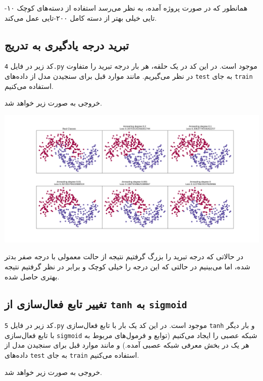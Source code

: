 \documentclass[a4paper, 12pt]{article}
\theoremstyle{definition}
\begin{document}
همانطور که در صورت پروژه آمده، به نظر می‌رسد استفاده از دسته‌های کوچک ۱۰-تایی خیلی بهتر از دسته کامل ۲۰۰-تایی عمل می‌کند.

\subsection{تبرید درجه یادگیری به تدریج}
کد زیر در فایل
\texttt{4.py}
موجود است. در این کد در یک حلقه، هر بار درجه تبرید را متفاوت در نظر می‌گیریم. مانند موارد قبل برای سنجیدن مدل از داده‌های
\texttt{test}
به جای
\texttt{train}
استفاده می‌کنیم.

\LTR

\RTL

خروجی به صورت زیر خواهد شد.

\begin{center}
    \includegraphics[width=\textwidth]{figs/4.png}
\end{center}

در حالاتی که درجه تبرید را بزرگ گرفتیم نتیجه از حالت معمولی با درجه صفر بدتر شده، اما می‌بینیم در حالتی که این درجه را خیلی کوچک و برابر
در نظر گرفتیم نتیجه بهتری حاصل شده.

\subsection{تغییر تابع فعال‌سازی از \texttt{tanh} به \texttt{sigmoid}}
کد زیر در فایل
\texttt{5.py}
موجود است. در این کد یک بار با تابع فعال‌سازی
\texttt{tanh}
و بار دیگر با تابع فعال‌سازی
\texttt{sigmoid}
شبکه عصبی را ایجاد می‌کنیم (توابع و فرمول‌های مربوط به هر یک در بخش معرفی شبکه عصبی آمده.) و مانند موارد قبل برای سنجیدن مدل از داده‌های
\texttt{test}
به جای
\texttt{train}
استفاده می‌کنیم.

\LTR

\RTL

خروجی به صورت زیر خواهد شد.
\end{document}
